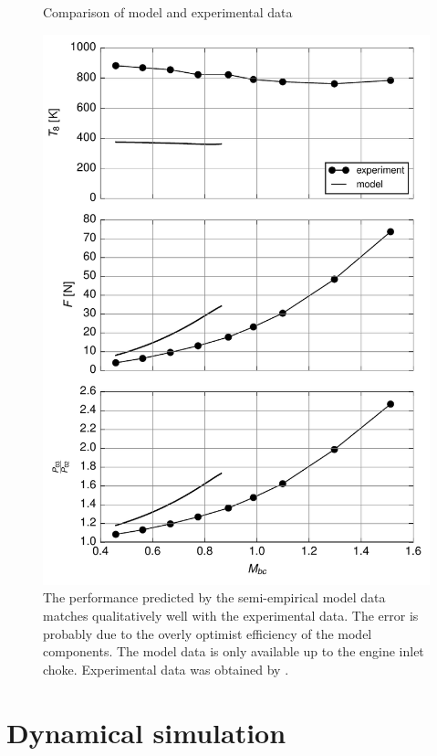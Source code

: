 \documentclass[tcc]{subfiles}
\begin{document}
\begin{figure}
    \caption{Comparison of model and experimental data}
    \includegraphics{fig/experimental}
    \source{\authorsfigure}
    \caption*{The performance predicted by the semi-empirical model data matches qualitatively well with the experimental data. The error is probably due to the overly optimist efficiency of the model components. The model data is only available up to the engine inlet choke. Experimental data was obtained by \textcite{bolsoni_test}.}
\end{figure}

\section{Dynamical simulation}
\end{document}

